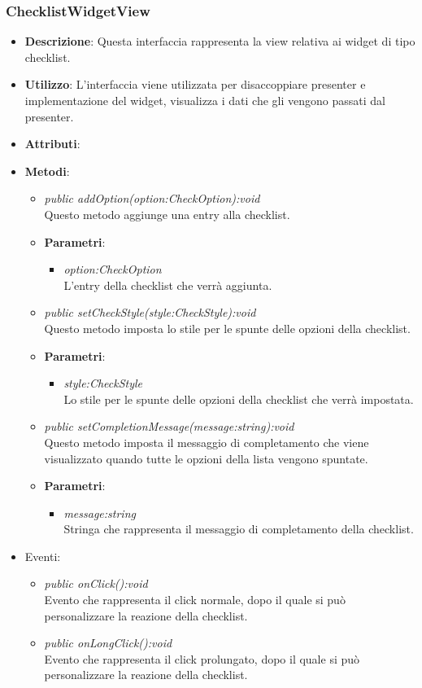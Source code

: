 \subsubsection{ChecklistWidgetView}
\begin{itemize}
\item \textbf{Descrizione}: Questa interfaccia rappresenta la view relativa ai widget di tipo checklist.
\item \textbf{Utilizzo}: L'interfaccia viene utilizzata per disaccoppiare presenter e implementazione del widget, visualizza i dati che gli vengono passati dal presenter.
\item \textbf{Attributi}:
\item \textbf{Metodi}:
	\begin{itemize}
	\item \textit{public addOption(option:CheckOption):void}\\
	Questo metodo aggiunge una entry alla checklist.
		\item{\textbf{Parametri}: \begin{itemize}
		\item \textit{option:CheckOption}\\
		L'entry della checklist che verrà aggiunta.
		\end{itemize}}
	\item \textit{public setCheckStyle(style:CheckStyle):void}\\
	Questo metodo imposta lo stile per le spunte delle opzioni della checklist.
		\item{\textbf{Parametri}: \begin{itemize}
		\item \textit{style:CheckStyle}\\
		Lo stile per le spunte delle opzioni della checklist che verrà impostata.
		\end{itemize}} 
	\item \textit{public setCompletionMessage(message:string):void}\\
	Questo metodo imposta il messaggio di completamento che viene visualizzato quando tutte le opzioni della lista vengono spuntate.
		\item{\textbf{Parametri}: \begin{itemize}
		\item \textit{message:string}\\
		Stringa che rappresenta il messaggio di completamento della checklist.
		\end{itemize}}
	\end{itemize}
\item{Eventi}:
	\begin{itemize}
	\item \textit{public onClick():void}\\
	Evento che rappresenta il click normale, dopo il quale si può personalizzare la reazione della checklist.
	\item \textit{public onLongClick():void}\\
	Evento che rappresenta il click prolungato, dopo il quale si può personalizzare la reazione della checklist.
	\end{itemize}
\end{itemize}

